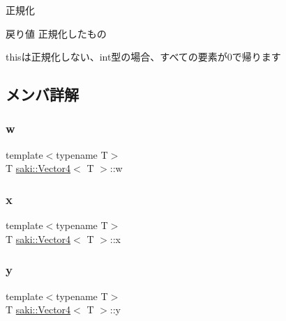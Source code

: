 正規化 

\begin{DoxyReturn}{戻り値}
正規化したもの
\end{DoxyReturn}
thisは正規化しない、int型の場合、すべての要素が0で帰ります 

\subsection{メンバ詳解}
\mbox{\label{classsaki_1_1_vector4_a626a70f13cca824eae75e80cb1179b1b}} 
\subsubsection{\texorpdfstring{w}{w}}
{\footnotesize\ttfamily template$<$typename T$>$ \\
T \mbox{\hyperlink{classsaki_1_1_vector4}{saki\+::\+Vector4}}$<$ T $>$\+::w}

\mbox{\label{classsaki_1_1_vector4_a601546b2852aaf7653bf48308d9f8925}} 
\subsubsection{\texorpdfstring{x}{x}}
{\footnotesize\ttfamily template$<$typename T$>$ \\
T \mbox{\hyperlink{classsaki_1_1_vector4}{saki\+::\+Vector4}}$<$ T $>$\+::x}

\mbox{\label{classsaki_1_1_vector4_a235e5764e2932caedffb0eb924b6f5b9}} 
\subsubsection{\texorpdfstring{y}{y}}
{\footnotesize\ttfamily template$<$typename T$>$ \\
T \mbox{\hyperlink{classsaki_1_1_vector4}{saki\+::\+Vector4}}$<$ T $>$\+::y}

\mbox{\label{classsaki_1_1_vector4_ac3364f312a32b272d81999f68e49c41c}} 
